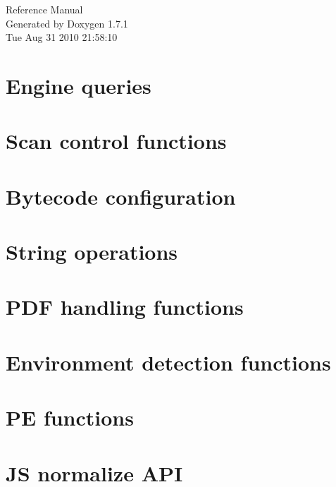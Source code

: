 \documentclass[a4paper]{article}
\begin{document}
\hypersetup{pageanchor=false}
\begin{titlepage}
\vspace*{7cm}
\begin{center}
{\Large Reference Manual}\\
\vspace*{1cm}
{\large Generated by Doxygen 1.7.1}\\
\vspace*{0.5cm}
{\small Tue Aug 31 2010 21:58:10}\\
\end{center}
\end{titlepage}
\tableofcontents
{}
\hypersetup{pageanchor=true}
\section{Engine queries}
\label{engineq}
\hypertarget{engineq}{}

\section{Scan control functions}
\label{scanc}
\hypertarget{scanc}{}

\section{Bytecode configuration}
\label{config}
\hypertarget{config}{}

\section{String operations}
\label{stringops}
\hypertarget{stringops}{}

\section{PDF handling functions}
\label{pdfg}
\hypertarget{pdfg}{}

\section{Environment detection functions}
\label{envdet}
\hypertarget{envdet}{}

\section{PE functions}
\label{pe}
\hypertarget{pe}{}

\section{JS normalize API}
\label{js}
\hypertarget{js}{}

\end{document}
